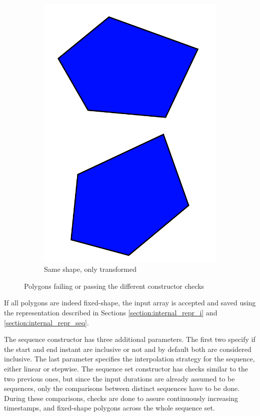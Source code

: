 \begin{figure}[h!]
\begin{subfigure}{.3\textwidth}
        \includegraphics[width=\textwidth]{images/pass_all_tests.pdf}
        \caption{Same shape, only transformed}
    \end{subfigure}
    \caption{Polygons failing or passing the different constructor checks}
    \label{fig:constr_checks}
\end{figure}

If all polygons are indeed fixed-shape, the input array is accepted and saved using the representation described in Sections \ref{section:internal_repr_i} and \ref{section:internal_repr_seq}.

The sequence constructor has three additional parameters. The first two specify if the start and end instant are inclusive or not and by default both are considered inclusive. The last parameter specifies the interpolation strategy for the sequence, either linear or stepwise. The sequence set constructor has checks similar to the two previous ones, but since the input durations are already assumed to be sequences, only the comparisons between distinct sequences have to be done. During these comparisons, checks are done to assure continuously increasing timestamps, and fixed-shape polygons across the whole sequence set.

